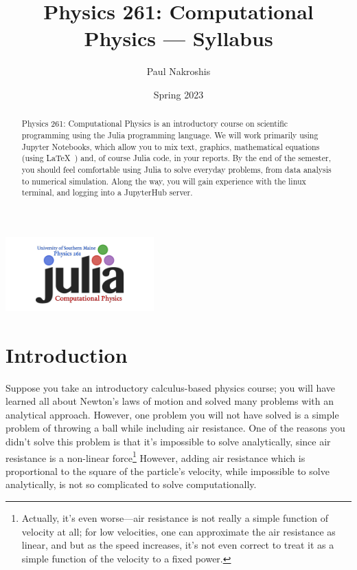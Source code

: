 \documentclass[justified]{tufte-handout}
\title{Physics 261: Computational Physics --- Syllabus}
\author[Paul A. Nakroshis]{Paul Nakroshis}
\date{Spring 2023}  %
\begin{document}
\maketitle%
  
\begin{marginfigure} [7\baselineskip]\includegraphics[width=2.25in]{USM_Phy261_logo.png} \end{marginfigure}

\begin{abstract}
\noindent Physics 261: Computational Physics is an introductory course on
scientific programming using the Julia programming language. We will work primarily 
using Jupyter Notebooks, which allow you to mix text, graphics, mathematical equations (using
 \LaTeX\ ) and, of course Julia code, in your reports.  By the 
end of the semester, you should feel comfortable using Julia to solve everyday 
problems, from data analysis to numerical simulation. Along the way, you will gain experience
with the linux terminal, and logging into a JupyterHub server. 
 \end{abstract}

\section{Introduction}\label{sec:page-layout}
Suppose you take an introductory calculus-based physics course; you will 
have learned all about Newton's laws of motion and solved many problems
with an analytical approach. However, one problem you will not have solved
is a simple problem of throwing a ball while including air resistance. One of the reasons 
you didn't solve this problem is that it's impossible to solve analytically, since air resistance is 
a non-linear force\footnote{Actually, it's even worse---air resistance is not really a simple function of velocity at all; for low velocities, one can approximate the air resistance as linear, and but as the speed increases, it's not even correct to treat it as a simple function of the velocity to a fixed power.} However, adding air resistance which is proportional to the square of the particle's velocity, while impossible to solve analytically, is not so complicated to solve computationally. 
\end{document}
